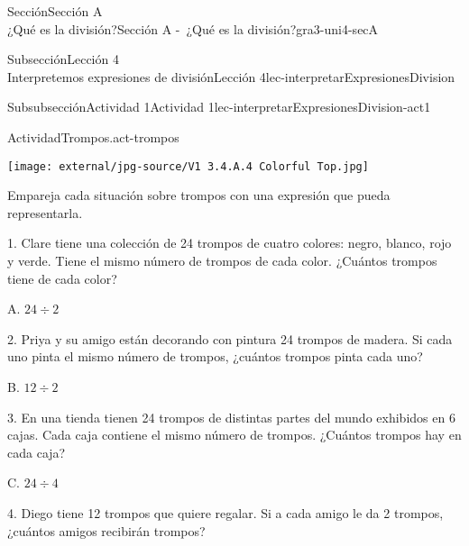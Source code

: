 \begin{sectionptx}{Sección}{{\Large Sección A\\}¿Qué es la división?}{}{Sección A -~¿Qué es la división?}{}{}{gra3-uni4-secA}
\begin{subsectionptx}{Subsección}{{\normalsize Lección 4\\[-0.05cm]}Interpretemos expresiones de división}{}{Lección 4}{}{}{lec-interpretarExpresionesDivision}
\begin{subsubsectionptx}{Subsubsección}{Actividad 1}{}{Actividad 1}{}{}{lec-interpretarExpresionesDivision-act1}
\begin{activity}{Actividad}{Trompos.}{act-trompos}
\begin{sidebyside}{5}{0}{0}{0}
\begin{sbspanel}{0.2}
\end{sbspanel}%
\begin{sbspanel}{0.2}%
\texttt{[image: external/jpg-source/V1 3.4.A.4 Colorful Top.jpg]}
\end{sbspanel}%
\end{sidebyside}%
\par
Empareja cada situación sobre trompos con una expresión que pueda representarla.%
\clearpage
\begin{sidebyside}{2}{0.05}{0}{0.15}%
\begin{sbspanel}{0.6}%
1. Clare tiene una colección de 24 trompos de cuatro colores: negro, blanco, rojo y verde. Tiene el mismo número de trompos de cada color. ¿Cuántos trompos tiene de cada color?%
\end{sbspanel}%
\begin{sbspanel}{0.2}%
\par
A. \(24 \div 2\)%
\end{sbspanel}%
\end{sidebyside}%
\begin{sidebyside}{2}{0.05}{0}{0.15}%
\begin{sbspanel}{0.6}%
2. Priya y su amigo están decorando con pintura 24 trompos de madera. Si cada uno pinta el mismo número de trompos, ¿cuántos trompos pinta cada uno?%
\end{sbspanel}%
\begin{sbspanel}{0.2}%
\par
B. \(12 \div 2\)%
\end{sbspanel}%
\end{sidebyside}%
\begin{sidebyside}{2}{0.05}{0}{0.15}%
\begin{sbspanel}{0.6}%
3. En una tienda tienen 24 trompos de distintas partes del mundo exhibidos en 6 cajas. Cada caja contiene el mismo número de trompos. ¿Cuántos trompos hay en cada caja?%
\end{sbspanel}%
\begin{sbspanel}{0.2}%
\par
C. \(24 \div 4\)%
\end{sbspanel}%
\end{sidebyside}%
\begin{sidebyside}{2}{0.05}{0}{0.15}%
\begin{sbspanel}{0.6}%
4. Diego tiene 12 trompos que quiere regalar. Si a cada amigo le da 2 trompos, ¿cuántos amigos recibirán trompos?%
\end{sbspanel}%
\begin{sbspanel}{0.2}%

\end{sbspanel}
\end{sidebyside}
\end{activity}
\end{subsubsectionptx}
\end{subsectionptx}
\end{sectionptx}
